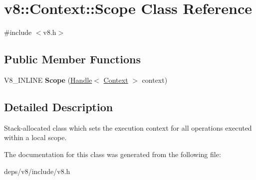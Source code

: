 \hypertarget{classv8_1_1_context_1_1_scope}{}\section{v8\+:\+:Context\+:\+:Scope Class Reference}
\label{classv8_1_1_context_1_1_scope}


{\ttfamily \#include $<$v8.\+h$>$}

\subsection*{Public Member Functions}
\begin{DoxyCompactItemize}
\item 
\hypertarget{classv8_1_1_context_1_1_scope_a171c1cb92354b52c8b1764e88b9540c8}{}V8\+\_\+\+I\+N\+L\+I\+N\+E {\bfseries Scope} (\hyperlink{classv8_1_1_handle}{Handle}$<$ \hyperlink{classv8_1_1_context}{Context} $>$ context)\label{classv8_1_1_context_1_1_scope_a171c1cb92354b52c8b1764e88b9540c8}

\end{DoxyCompactItemize}


\subsection{Detailed Description}
Stack-\/allocated class which sets the execution context for all operations executed within a local scope. 

The documentation for this class was generated from the following file\+:\begin{DoxyCompactItemize}
\item 
deps/v8/include/v8.\+h\end{DoxyCompactItemize}
